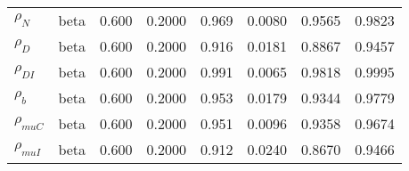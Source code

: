 \begin{center}
\begin{longtable}{llcccccc}
${\rho_N}$ & beta &   0.600 & 0.2000 &   0.969& 0.0080 &  0.9565 &  0.9823 \\ 
${\rho_D}$ & beta &   0.600 & 0.2000 &   0.916& 0.0181 &  0.8867 &  0.9457 \\ 
${\rho_{DI}}$ & beta &   0.600 & 0.2000 &   0.991& 0.0065 &  0.9818 &  0.9995 \\ 
${\rho_b}$ & beta &   0.600 & 0.2000 &   0.953& 0.0179 &  0.9344 &  0.9779 \\ 
${\rho_{muC}}$ & beta &   0.600 & 0.2000 &   0.951& 0.0096 &  0.9358 &  0.9674 \\ 
${\rho_{muI}}$ & beta &   0.600 & 0.2000 &   0.912& 0.0240 &  0.8670 &  0.9466 \\ 
\end{longtable}
 \end{center}
